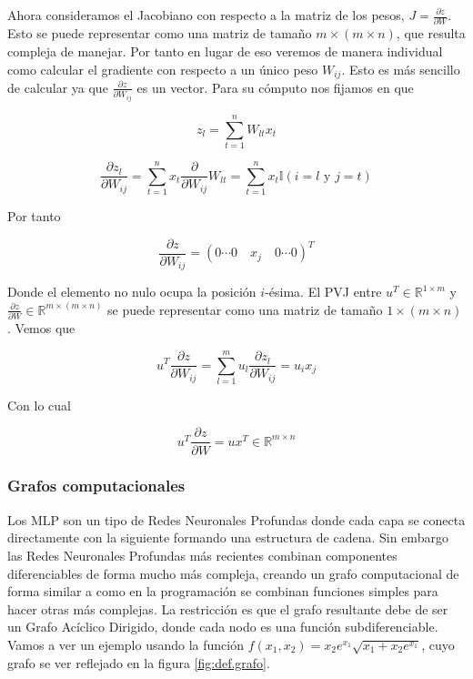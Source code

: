 Ahora consideramos el Jacobiano con respecto a la matriz de los pesos, $J=\frac{\partial z}{\partial W}$. Esto se puede representar como una matriz de tamaño $m \times (m \times n)$, que resulta compleja de manejar. Por tanto en lugar de eso veremos de manera individual como calcular el gradiente con respecto a un único peso $W_{ij}$. Esto es más sencillo de calcular ya que $\frac{\partial z}{\partial W_{ij}}$ es un vector. Para su cómputo nos fijamos en que 

$$z_l = \sum_{t=1}^n W_{lt}x_t$$

$$\frac{\partial z_l}{\partial W_{ij}} = \sum_{t=1}^n x_t \frac{\partial}{\partial W_{ij}} W_{lt} = \sum_{t=1}^n x_t \mathbb{I}(i=l \textrm{ y } j=t) $$

Por tanto

$$\frac{\partial z}{\partial W_{ij}} = \left ( 0 \cdots 0 \quad x_j \quad 0 \cdots 0 \right )^T$$

Donde el elemento no nulo ocupa la posición $i$-ésima. El PVJ entre $u^T \in \mathbb{R}^{1 \times m}$ y $\frac{\partial z}{\partial W} \in \mathbb{R}^{m \times ( m \times n)}$ se puede representar como una matriz de tamaño $1 \times (m \times n)$. Vemos que 

$$u^T \frac{\partial z}{\partial W_{ij}}= \sum_{l=1}^m u_l \frac{\partial z_l}{\partial W_{ij}} = u_i x_j$$

Con lo cual

$$ u^T \frac{\partial z}{\partial W}  = ux^T \in \mathbb{R}^{m \times n}$$



\subsubsection{Grafos computacionales}

Los MLP son un tipo de Redes Neuronales Profundas donde cada capa se conecta directamente con la siguiente formando una estructura de cadena. Sin embargo las Redes Neuronales Profundas más recientes combinan componentes diferenciables de forma mucho más compleja, creando un grafo computacional de forma similar a como en la programación se combinan funciones simples para hacer otras más complejas. La restricción es que el grafo resultante debe de ser un Grafo Acíclico Dirigido, donde cada nodo es una función subdiferenciable. Vamos a ver un ejemplo usando la función $f(x_1,x_2)=x_2e^{x_1}\sqrt{x_1+x_2e^{x_1}}$, cuyo grafo se ver reflejado en la figura \ref{fig:def.grafo}.


